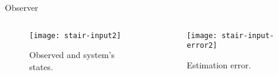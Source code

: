 \begin{slide}{Observer}
  \begin{columns}[c]
    \begin{column}{0.55\textwidth}
      \begin{figure}[ht!]
        \centering
        \texttt{[image: stair-input2]}
        \caption{Observed and system's states.}%
      \end{figure}
    \end{column}%
    \hfill%
    \begin{column}{0.55\textwidth}
      \begin{figure}[ht!]
        \centering
        \texttt{[image: stair-input-error2]}
        \caption{Estimation error.}%
      \end{figure}
    \end{column}%
  \end{columns}
\end{slide}


